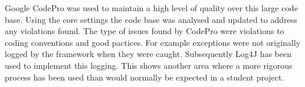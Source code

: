 Google CodePro\cite{codeproweb} was used to maintain a high level of quality over this large code base.
Using the core settings the code base was analysed and updated to address any violations found.
The type of issues found by CodePro were violations to coding conventions and good pactices.
For example exceptions were not originally logged by the framework when they were caught.
Subsequently Log4J\cite{log4jweb} has been used to implement this logging.
This shows another area where a more rigorous process has been used than would normally be expected in a student project.



% 
% 
% 
% 
